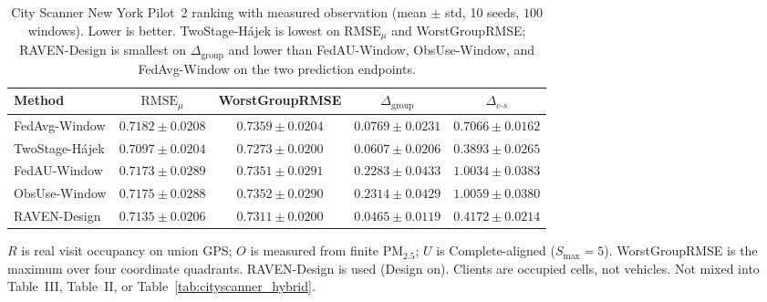 \begin{table}[t]
\centering
\caption{City Scanner New York Pilot~2 ranking with measured observation
(mean $\pm$ std, 10 seeds, $100$ windows).  Lower is better.
TwoStage-H\'ajek is lowest on $\mathrm{RMSE}_{\mu}$ and WorstGroupRMSE;
RAVEN-Design is smallest on $\Delta_{\mathrm{group}}$ and
lower than FedAU-Window, ObsUse-Window, and FedAvg-Window on the two prediction
endpoints.}
\label{tab:cityscanner_p2_measured_o}
\scriptsize
\setlength{\tabcolsep}{2.5pt}
\begin{tabular*}{\textwidth}{@{\extracolsep{\fill}}lcccc}
\toprule
Method & $\mathrm{RMSE}_{\mu}$ & WorstGroupRMSE &
$\Delta_{\mathrm{group}}$ & $\Delta_{c\text{-}s}$\\
\midrule
FedAvg-Window & $0.7182{\pm}0.0208$ & $0.7359{\pm}0.0204$ & $0.0769{\pm}0.0231$ & $0.7066{\pm}0.0162$\\
TwoStage-H\'ajek & $\mathbf{0.7097}{\pm}0.0204$ & $\mathbf{0.7273}{\pm}0.0200$ & $0.0607{\pm}0.0206$ & $\mathbf{0.3893}{\pm}0.0265$\\
FedAU-Window & $0.7173{\pm}0.0289$ & $0.7351{\pm}0.0291$ & $0.2283{\pm}0.0433$ & $1.0034{\pm}0.0383$\\
ObsUse-Window & $0.7175{\pm}0.0288$ & $0.7352{\pm}0.0290$ & $0.2314{\pm}0.0429$ & $1.0059{\pm}0.0380$\\
RAVEN-Design & $0.7135{\pm}0.0206$ & $0.7311{\pm}0.0200$ & $\mathbf{0.0465}{\pm}0.0119$ & $0.4172{\pm}0.0214$\\
\bottomrule
\end{tabular*}

\par\vspace{2pt}
\noindent\raggedright\scriptsize
$R$ is real visit occupancy on union GPS; $O$ is measured from finite
{PM}$_{2.5}$; $U$ is Complete-aligned ($S_{\max}=5$).
WorstGroupRMSE is the maximum over four coordinate quadrants.
RAVEN-Design is used (Design on).
Clients are occupied cells, not vehicles.
Not mixed into Table~III,
Table~II, or Table~\ref{tab:cityscanner_hybrid}.
\end{table}


